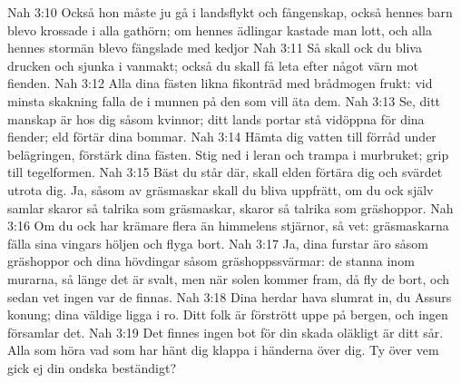 Nah 3:10  Också hon måste ju gå i landsflykt och fångenskap, också hennes barn blevo krossade i alla gathörn; om hennes ädlingar kastade man lott, och alla hennes stormän blevo fängslade med kedjor
Nah 3:11  Så skall ock du bliva drucken och sjunka i vanmakt; också du skall få leta efter något värn mot fienden.
Nah 3:12  Alla dina fästen likna fikonträd med brådmogen frukt: vid minsta skakning falla de i munnen på den som vill äta dem.
Nah 3:13  Se, ditt manskap är hos dig såsom kvinnor; ditt lands portar stå vidöppna för dina fiender; eld förtär dina bommar.
Nah 3:14  Hämta dig vatten till förråd under belägringen, förstärk dina fästen. Stig ned i leran och trampa i murbruket; grip till tegelformen.
Nah 3:15  Bäst du står där, skall elden förtära dig och svärdet utrota dig. Ja, såsom av gräsmaskar skall du bliva uppfrätt, om du ock själv samlar skaror så talrika som gräsmaskar, skaror så talrika som gräshoppor.
Nah 3:16  Om du ock har krämare flera än himmelens stjärnor, så vet: gräsmaskarna fälla sina vingars höljen och flyga bort.
Nah 3:17  Ja, dina furstar äro såsom gräshoppor och dina hövdingar såsom gräshoppssvärmar: de stanna inom murarna, så länge det är svalt, men när solen kommer fram, då fly de bort, och sedan vet ingen var de finnas.
Nah 3:18  Dina herdar hava slumrat in, du Assurs konung; dina väldige ligga i ro. Ditt folk är förstrött uppe på bergen, och ingen församlar det.
Nah 3:19  Det finnes ingen bot för din skada oläkligt är ditt sår. Alla som höra vad som har hänt dig klappa i händerna över dig. Ty över vem gick ej din ondska beständigt?


